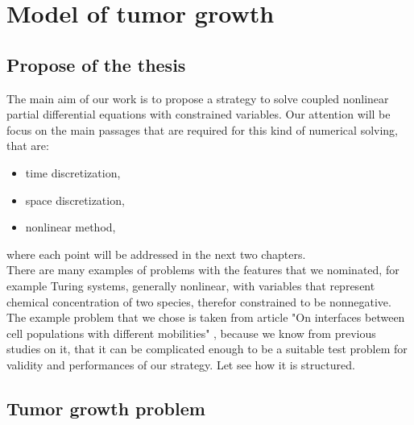 \chapter{Model of tumor growth}
\section{Propose of the thesis}
The main aim of our work is to propose a strategy to solve coupled nonlinear partial differential equations with constrained variables. Our attention will be focus on the main passages that are required for this kind of numerical solving, that are:
\begin{itemize}
	\item time discretization,
	\item space discretization,
	\item nonlinear method,
\end{itemize}  
where each point will be addressed in the next two chapters. \\
There are many examples of problems with the features that we nominated, for example Turing systems, generally nonlinear, with variables that represent chemical concentration of two species, therefor constrained to be nonnegative. \\
The example problem that we chose is taken from article "On interfaces between cell populations with different mobilities" \cite{tumor_growth}, because we know from previous studies on it, that it can be complicated enough to be a suitable test problem for validity and performances of our strategy.
Let see how it is structured. 
\section{Tumor growth problem}
